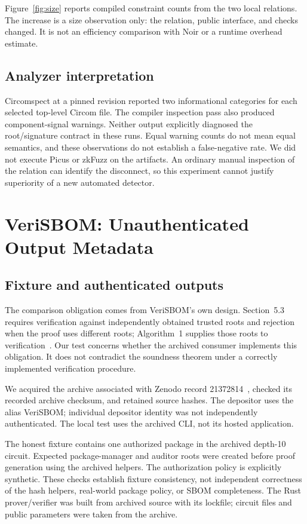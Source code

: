 \documentclass[sigconf,nonacm]{acmart}
\begin{document}
Figure~\ref{fig:size} reports compiled constraint counts from the two local relations. The increase is a size observation only: the relation, public interface, and checks changed. It is not an efficiency comparison with Noir or a runtime overhead estimate.


\subsection{Analyzer interpretation}
Circomspect at a pinned revision reported two informational categories for each selected top-level Circom file. The compiler inspection pass also produced component-signal warnings. Neither output explicitly diagnosed the root/signature contract in these runs. Equal warning counts do not mean equal semantics, and these observations do not establish a false-negative rate. We did not execute Picus or zkFuzz on the artifacts. An ordinary manual inspection of the relation can identify the disconnect, so this experiment cannot justify superiority of a new automated detector.

\section{VeriSBOM: Unauthenticated Output Metadata}
\subsection{Fixture and authenticated outputs}
The comparison obligation comes from VeriSBOM's own design. Section~5.3 requires verification against independently obtained trusted roots and rejection when the proof uses different roots; Algorithm~1 supplies those roots to verification~\cite{verisbom}. Our test concerns whether the archived consumer implements this obligation. It does not contradict the soundness theorem under a correctly implemented verification procedure.

We acquired the archive associated with Zenodo record 21372814~\cite{veriartifact}, checked its recorded archive checksum, and retained source hashes. The depositor uses the alias VeriSBOM; individual depositor identity was not independently authenticated. The local test uses the archived CLI, not its hosted application.

The honest fixture contains one authorized package in the archived depth-10 circuit. Expected package-manager and auditor roots were created before proof generation using the archived helpers. The authorization policy is explicitly synthetic. These checks establish fixture consistency, not independent correctness of the hash helpers, real-world package policy, or SBOM completeness. The Rust prover/verifier was built from archived source with its lockfile; circuit files and public parameters were taken from the archive.
\end{document}
